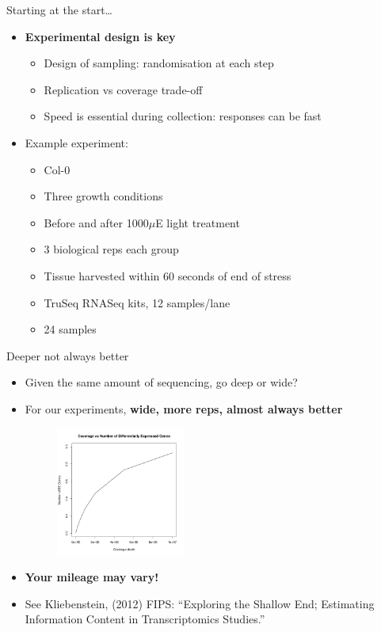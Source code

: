 \documentclass[t]{beamer}
\begin{document}
\begin{frame}{Starting at the start\ldots}
  \begin{itemize}
    \item \textbf{Experimental design is key}
    \begin{itemize}
      \item Design of sampling: randomisation at each step
      \item Replication vs coverage trade-off
      \item Speed is essential during collection: responses can be fast
    \end{itemize}
    \pause
    \item Example experiment:
    \begin{itemize}
      \item Col-0
      \item Three growth conditions
      \item Before and after 1000$\mu$E light treatment
      \item 3 biological reps each group
      \item Tissue harvested within 60 seconds of end of stress
      \item TruSeq RNASeq kits, 12 samples/lane
      \item 24 samples
    \end{itemize}
  \end{itemize}
\end{frame}

\begin{frame}{Deeper not always better}
  \begin{itemize}
    \item Given the same amount of sequencing, go deep or wide?
    \pause
    \item For our experiments, \textbf{wide, more reps, almost always better}
    \pause
    \begin{figure}[h]
      \begin{center}
        \includegraphics[width=0.4\textwidth]{./img/coverage.png}
      \end{center}
    \end{figure}
    \pause
    \item \textbf{Your mileage may vary!}
    \item \tiny{See Kliebenstein, (2012) FIPS: “Exploring the Shallow End;
                Estimating Information Content in Transcriptomics Studies.”}
  \end{itemize}
\end{frame}
\end{document}
